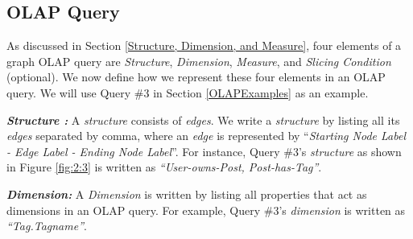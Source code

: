 %
%
%
%
%
%
%

\subsection{OLAP Query}

As discussed in Section \ref{Structure, Dimension, and Measure}, four elements of a graph OLAP query are \textit{Structure}, \textit{Dimension}, \textit{Measure}, and \textit{Slicing Condition} (optional). We now define how we represent these four elements in an OLAP query. We will use Query \#3 in Section \ref{OLAPExamples} as an example.

\noindent\textbf{\textit{Structure :}} A \textit{structure} consists of \textit{edges}. We write a \textit{structure} by listing all its \textit{edges} separated by comma, where an \textit{edge} is represented by ``\textit{Starting Node Label - Edge Label - Ending Node Label}''. For instance, Query \#3's \textit{structure} as shown in Figure \ref{fig:2:3} is written as \textit{``User-owns-Post, Post-has-Tag''}.



\noindent\textbf{\textit{Dimension:}} A
\textit{Dimension} is written by listing all properties that act as dimensions in an OLAP query. For example, Query \#3's \textit{dimension} is written as \textit{``Tag.Tagname''}.

